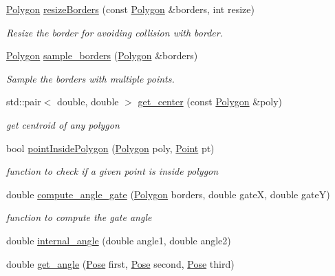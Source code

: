 \begin{DoxyCompactItemize}
\hyperlink{utils_8hpp_a18281038c49470960bd8f4d15b893441}{Polygon} \hyperlink{namespacestudent_a4533d2b12567821a0dbb957d0e607fc0}{resize\+Borders} (const \hyperlink{utils_8hpp_a18281038c49470960bd8f4d15b893441}{Polygon} \&borders, int resize)
\begin{DoxyCompactList}\small\item\em Resize the border for avoiding collision with border. \end{DoxyCompactList}\item 
\hyperlink{utils_8hpp_a18281038c49470960bd8f4d15b893441}{Polygon} \hyperlink{namespacestudent_acf7520b9efd4309e03ec51e8cd7642b0}{sample\+\_\+borders} (\hyperlink{utils_8hpp_a18281038c49470960bd8f4d15b893441}{Polygon} \&borders)
\begin{DoxyCompactList}\small\item\em Sample the borders with multiple points. \end{DoxyCompactList}\item 
std\+::pair$<$ double, double $>$ \hyperlink{namespacestudent_a4bc9329b042a3a7854a08219559fb863}{get\+\_\+center} (const \hyperlink{utils_8hpp_a18281038c49470960bd8f4d15b893441}{Polygon} \&poly)
\begin{DoxyCompactList}\small\item\em get centroid of any polygon \end{DoxyCompactList}\item 
bool \hyperlink{namespacestudent_a9c112c915d7bf1e28084673499b7d5ef}{point\+Inside\+Polygon} (\hyperlink{utils_8hpp_a18281038c49470960bd8f4d15b893441}{Polygon} poly, \hyperlink{structPoint}{Point} pt)
\begin{DoxyCompactList}\small\item\em function to check if a given point is inside polygon \end{DoxyCompactList}\item 
double \hyperlink{namespacestudent_a2da434a66dc725fa325433bb9bd4e989}{compute\+\_\+angle\+\_\+gate} (\hyperlink{utils_8hpp_a18281038c49470960bd8f4d15b893441}{Polygon} borders, double gateX, double gateY)
\begin{DoxyCompactList}\small\item\em function to compute the gate angle \end{DoxyCompactList}\item 
double \hyperlink{namespacestudent_ac8e0adb0fb2cb218e2410c460af2cae7}{internal\+\_\+angle} (double angle1, double angle2)
\item 
double \hyperlink{namespacestudent_ac51402ca51fa6c279f88cf560e32b422}{get\+\_\+angle} (\hyperlink{structPose}{Pose} first, \hyperlink{structPose}{Pose} second, \hyperlink{structPose}{Pose} third)

\end{DoxyCompactItemize}
